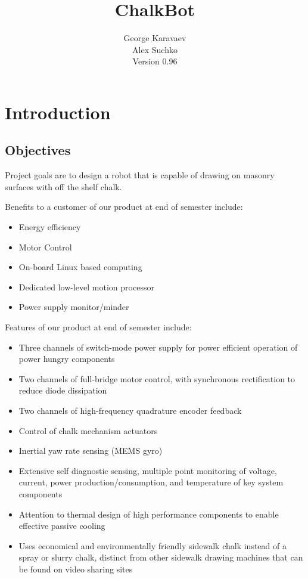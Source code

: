 \documentclass[12pt]{article}
\title{ChalkBot}
\author{George Karavaev\\ Alex Suchko\\ \normalsize Version 0.96}
\begin{document}
  \maketitle 
 \newpage
 \tableofcontents
 \newpage
 \section{Introduction}
 \subsection{Objectives}
 Project goals are to design a robot that is capable of drawing on masonry surfaces with off the shelf chalk. 
 
 Benefits to a customer of our product at end of semester include:
 \begin{itemize}
  \item Energy efficiency
  \item Motor Control
  \item On-board Linux based computing
  \item Dedicated low-level motion processor
  \item Power supply monitor/minder
\end{itemize}
Features of our product at end of semester include:
   \begin{itemize}
  \item Three channels of switch-mode power supply for power efficient operation of power hungry components
  \item Two channels of full-bridge motor control, with synchronous rectification to reduce diode dissipation
  \item Two channels of high-frequency quadrature encoder feedback
  \item Control of chalk mechanism actuators
  \item Inertial yaw rate sensing (MEMS gyro)
  \item Extensive self diagnostic sensing, multiple point monitoring of voltage, current, power production/consumption, and temperature of key system components
  \item Attention to thermal design of high performance components to enable effective passive cooling
  \item Uses economical and environmentally friendly sidewalk chalk instead of a spray or slurry chalk, distinct from other sidewalk drawing machines that can be found on video sharing sites
\end{itemize}
  
\end{document}
